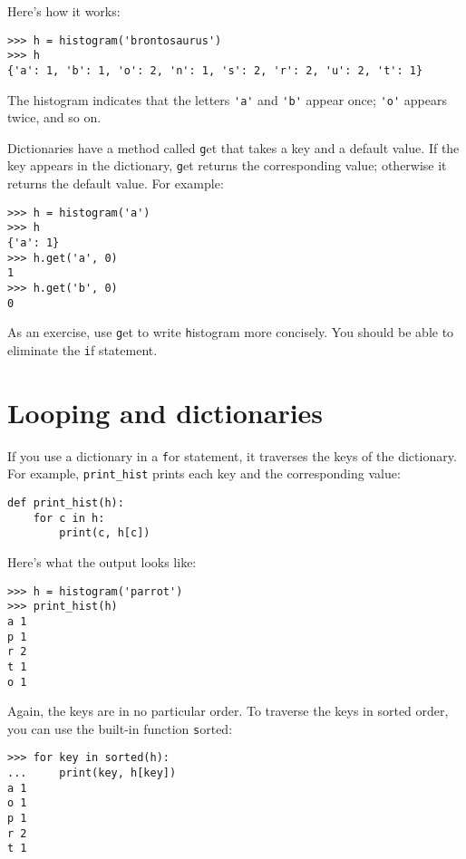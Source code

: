 \documentclass[
DIV=11,
fontsize=12,
twoside,
headinclude=false,
titlepage=firstiscover,
abstract=true,
headsepline=true,
footsepline=true,
chapterprefix=true, %
headings=big,
bibliography=totoc,%
captions=tableheading
]{scrbook}
\theoremstyle{definition}
\begin{document}
Here's how it works:

\begin{lstlisting}
>>> h = histogram('brontosaurus')
>>> h
{'a': 1, 'b': 1, 'o': 2, 'n': 1, 's': 2, 'r': 2, 'u': 2, 't': 1}
\end{lstlisting}
%
The histogram indicates that the letters \verb"'a'" and \verb"'b'"
appear once; \verb"'o'" appears twice, and so on.


Dictionaries have a method called {\texttt get} that takes a key
and a default value.  If the key appears in the dictionary,
{\texttt get} returns the corresponding value; otherwise it returns
the default value.  For example:

\begin{lstlisting}
>>> h = histogram('a')
>>> h
{'a': 1}
>>> h.get('a', 0)
1
>>> h.get('b', 0)
0
\end{lstlisting}
%
As an exercise, use {\texttt get} to write {\texttt histogram} more concisely.  You
should be able to eliminate the {\texttt if} statement.


\section{Looping and dictionaries}

If you use a dictionary in a {\texttt for} statement, it traverses
the keys of the dictionary.  For example, \verb"print_hist"
prints each key and the corresponding value:

\begin{lstlisting}
def print_hist(h):
    for c in h:
        print(c, h[c])
\end{lstlisting}
%
Here's what the output looks like:

\begin{lstlisting}
>>> h = histogram('parrot')
>>> print_hist(h)
a 1
p 1
r 2
t 1
o 1
\end{lstlisting}
%
Again, the keys are in no particular order.  To traverse the keys
in sorted order, you can use the built-in function {\texttt sorted}:

\begin{lstlisting}
>>> for key in sorted(h):
...     print(key, h[key])
a 1
o 1
p 1
r 2
t 1
\end{lstlisting}

\end{document}
